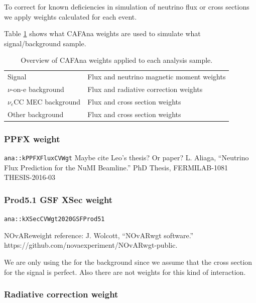 To correct for known deficiencies in simulation of neutrino flux or cross sections we apply weights calculated for each event.

Table \ref{tab:WeightsOverview} shows what CAFAna weights are used to simulate what signal/background sample.

\begin{table}[!ht]
\centering
\caption{Overview of CAFAna weights applied to each analysis sample.}
\def\arraystretch{1.4}
\begin{tabular}{l@{\hskip 1in}l}
Signal                   & Flux and neutrino magnetic moment weights\\
$\nu$-on-e background    & Flux and radiative correction weights\\
$\nu_e$CC MEC background & Flux and cross section weights\\
Other background         & Flux and cross section weights
\end{tabular}
\label{tab:WeightsOverview}
\end{table}

\subsubsection*{PPFX weight}
\texttt{ana::kPPFXFluxCVWgt} \cite{NOVA-doc-23441}
Maybe cite Leo's thesis? Or paper?
L. Aliaga, “Neutrino Flux Prediction for the NuMI Beamline.” PhD Thesis, FERMILAB-1081
THESIS-2016-03


\subsubsection*{Prod5.1 GSF XSec weight}
\texttt{ana::kXSecCVWgt2020GSFProd51}

NOvAReweight reference: J. Wolcott, “NOvARwgt software.” https://github.com/novaexperiment/NOvARwgt-public.


We are only using the for the background since we assume that the cross section for the signal is perfect. Also there are not weights for this kind of interaction.

\subsubsection*{Radiative correction weight}

